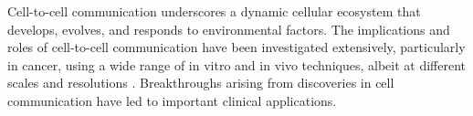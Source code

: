 Cell-to-cell communication underscores a dynamic cellular ecosystem that develops, evolves, and responds to environmental factors. The implications and roles of cell-to-cell communication have been investigated extensively, particularly in cancer, using a wide range of in vitro and in vivo techniques, albeit at different scales and resolutions \cite{brucher2014cell}. Breakthroughs arising from discoveries in cell communication have led to important clinical applications. 

